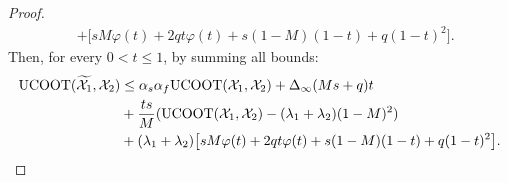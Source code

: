 \begin{proof}
\begin{equation}
\begin{split}
       &+ \big[ sM \varphi(t)+ 2q t \varphi(t) + s(1-M)(1-t) + q(1-t)^2 \big].
      \end{split}
    \end{equation}
    Then, for every $0 < t \leq 1$, by summing all bounds:
    \begin{equation}
      \begin{split}
        \text{UCOOT}(\widetilde{\mathcal X_1}, \mathcal X_2) &\leq \alpha_s\alpha_f \text{UCOOT}(\mathcal X_1, \mathcal X_2) +
        \Delta_{\infty}(Ms + q)t \\
        &+ \frac{ts}{M}(\text{UCOOT}(\mathcal X_1, \mathcal X_2) - (\lambda_1 + \lambda_2)(1-M)^2) \\
        &+ (\lambda_1 + \lambda_2) \big[ s M \varphi(t) + 2q t \varphi(t)
        + s(1-M)(1-t) + q(1-t)^2 \big].
      \end{split}
    \end{equation}

\end{proof}
